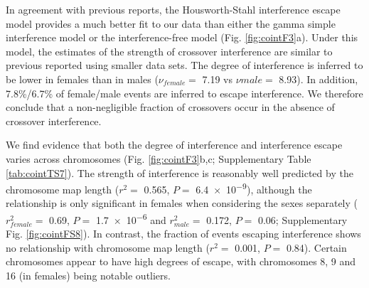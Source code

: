 In agreement with previous reports\cite{Housworth2003,Fledel-Alon2009}, the Housworth-Stahl
interference escape model provides a much better fit to our
data than either the gamma simple interference model or the
interference-free model (Fig. \ref{fig:cointF3}a). Under this model, the estimates
of the strength of crossover interference are similar to previous
reported using smaller data sets\cite{Fledel-Alon2009}. The degree of interference is
inferred to be lower in females than in males ($\nu_{female}=$ 7.19 vs
$\nu{male}=$ 8.93). In addition, 7.8\%/6.7\% of female/male events are
inferred to escape interference. We therefore conclude that a
non-negligible fraction of crossovers occur in the absence of
crossover interference.

We find evidence that both the degree of interference and
interference escape varies across chromosomes (Fig. \ref{fig:cointF3}b,c;
Supplementary Table \ref{tab:cointTS7}). The strength of interference is reasonably 
well predicted by the chromosome map length ($r^2=$ 0.565,
$P=$ \num{6.4e-9}), although the relationship is only significant in
females when considering the sexes separately ($r^2_{female}=$ 0.69,
$P=$ \num{1.7e-6} and $r^2_{male}=$ 0.172, $P=$ 0.06; Supplementary Fig. \ref{fig:cointFS8}).
In contrast, the fraction of events escaping interference shows no
relationship with chromosome map length ($r^2=$ 0.001, $P=$ 0.84).
Certain chromosomes appear to have high degrees of escape, with
chromosomes 8, 9 and 16 (in females) being notable outliers.



